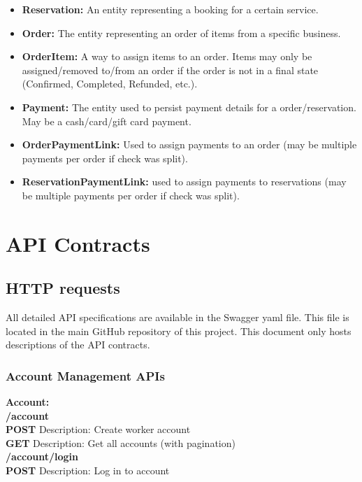 \documentclass[11pt,a4paper,pdftex]{article}
\begin{document}
\begin{itemize}
    \item \textbf{Reservation:} An entity representing a booking for a certain service.
    \item \textbf{Order:} The entity representing an order of items from a specific business.
    \item \textbf{OrderItem:} A way to assign items to an order. Items may only be assigned/removed to/from an order if the order is not in a final state (Confirmed, Completed, Refunded, etc.).
    \item \textbf{Payment:} The entity used to persist payment details for a order/reservation. May be a cash/card/gift card payment.
    \item \textbf{OrderPaymentLink:} Used to assign payments to an order (may be multiple payments per order if check was split).
    \item \textbf{ReservationPaymentLink:} used to assign payments to reservations (may be multiple payments per order if check was split).
\end{itemize}

\section{API Contracts}

\subsection{HTTP requests}

All detailed API specifications are available in the Swagger yaml file. This file is located in the main GitHub repository of this project. This document only hosts descriptions of the API contracts.

\subsubsection{Account Management APIs}
\textbf{Account:}\\
% 
\hspace*{1em}\textbf{/account}\\
\hspace*{2em}\textbf{POST} Description: Create worker account\\
\hspace*{2em}\textbf{GET} Description: Get all accounts (with pagination)\\

\hspace*{1em}\textbf{/account/login}\\
\hspace*{2em}\textbf{POST} Description: Log in to account\\
\end{document}
